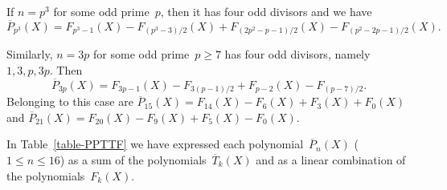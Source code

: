 \documentclass[11pt, a4paper]{amsart}
\theoremstyle{definition}
\newcommand\Pg{\overline{P}}
\newcommand\TT{\overline{T}}
\numberwithin{equation}{section}
\begin{document}
If $n = p^3$ for some odd prime~$p$, then it has four odd divisors and we have
\begin{equation*}
\Pg_{p^3}(X) = F_{p^3-1}(X) - F_{(p^3 - 3)/2}(X) + F_{(2p^2 - p - 1)/2}(X) - F_{(p^2 -2p -1)/2}(X) .
\end{equation*}

Similarly, $n = 3p$ for some odd prime~$p \geq 7$ has four odd divisors, namely $1, 3, p, 3p$. Then
\begin{equation*}
\Pg_{3p}(X) = F_{3p-1}(X) - F_{3(p-1)/2} + F_{p-2}(X) - F_{(p-7)/2}  .
\end{equation*}
Belonging to this case are 
$\Pg_{15}(X) = F_{14}(X) - F_6(X) + F_3(X) + F_0(X)$
and $\Pg_{21}(X) = F_{20}(X) - F_9(X) + F_5(X) - F_0(X)$.

In Table~\ref{table-PPTTF} we have expressed each polynomial~$\Pg_n(X)$ ($1 \leq n \leq 16$) 
as a sum of the polynomials~$\TT_k(X)$ and as a linear combination of the polynomials~$F_k(X)$.
\end{document}
